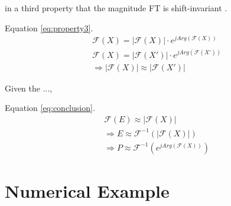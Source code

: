 \documentclass[journal]{IEEEtran}
\begin{document}
in a third property that the magnitude FT is shift-invariant \cite{proakis1995}.

Equation \ref{eq:property3}.
\begin{equation}
\label{eq:property3}
\begin{split}
&\mathcal{F}(X) = |\mathcal{F}(X)| \cdot e^{j Arg(\mathcal{F}(X))} \\
&\mathcal{F}(X) = |\mathcal{F}(X')| \cdot e^{j Arg(\mathcal{F}(X'))} \\
&\Rightarrow |\mathcal{F}(X)| \approx |\mathcal{F}(X')|
\end{split}
\end{equation}

Given the ..., 

Equation \ref{eq:conclusion}.
\begin{equation}
\label{eq:conclusion}
\begin{split}
&\mathcal{F}(E) \approx |\mathcal{F}(X)| \\
&\Rightarrow E \approx \mathcal{F}^{-1}(|\mathcal{F}(X)|) \\
&\Rightarrow P \approx \mathcal{F}^{-1}(e^{j Arg(\mathcal{F}(X))})
\end{split}
\end{equation}



\section{Numerical Example} %


\end{document}
